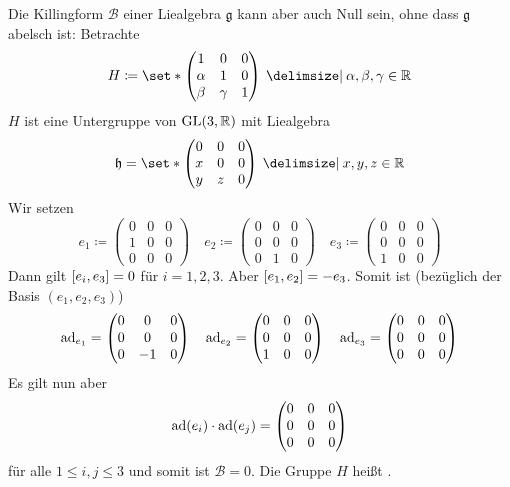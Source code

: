 \begin{beispiel*}[{name=[triviale Killingform trotz nicht abelscher Liealgebra]}]
	Die Killingform $\mathcal{B}$ einer Liealgebra $\mathfrak{g}$ kann aber auch Null sein, ohne dass $\mathfrak{g}$ abelsch ist: Betrachte
	\[
		H \coloneqq \set*{\begin{pmatrix}
			1 & 0 & 0 \\
			\alpha & 1 & 0 \\
			\beta & \gamma & 1
		\end{pmatrix} \given \alpha,\beta,\gamma \in \mathbb{R}}
	\]
	$H$ ist eine Untergruppe von $\GL(3,\mathbb{R})$ mit Liealgebra
	\[
		\mathfrak{h} = \set*{\begin{pmatrix}
			0 & 0 & 0 \\
			x & 0 & 0 \\
			y & z & 0
		\end{pmatrix} \given x,y,z \in \mathbb{R}}
	\]
	Wir setzen 
	\[
		e_1 \coloneqq \begin{pmatrix}
			0 & 0 & 0 \\
			1 & 0 & 0 \\
			0 & 0 & 0
		\end{pmatrix} \quad 
		e_2 \coloneqq \begin{pmatrix}
			0 & 0 & 0 \\
			0 & 0 & 0 \\
			0 & 1 & 0
		\end{pmatrix} \quad 
		e_3 \coloneqq \begin{pmatrix}
			0 & 0 & 0 \\
			0 & 0 & 0 \\
			1 & 0 & 0
		\end{pmatrix}
	\]
	Dann gilt $\benbrace*{e_i,e_3} = 0$ für $i=1,2,3$.
	Aber $\benbrace*{e_1,e_2}=-e_3$.
	Somit ist (bezüglich der Basis $(e_1,e_2,e_3)$)
	\[
		\ad_{e_1} = \begin{pmatrix}
			0 & 0 & 0 \\
			0 & 0 & 0 \\
			0 & -1 & 0
		\end{pmatrix} \quad 
		\ad_{e_2} = \begin{pmatrix}
			0 & 0 & 0 \\
			0 & 0 & 0 \\
			1 & 0 & 0 
		\end{pmatrix} \quad 
		\ad_{e_3} = \begin{pmatrix}
			0 & 0 & 0 \\
			0 & 0 & 0 \\
			0 & 0 & 0
		\end{pmatrix}
	\]
	Es gilt nun aber
	\[
		\ad(e_i) \cdot \ad(e_j) = \begin{pmatrix}
			0 & 0 & 0 \\
			0 & 0 & 0 \\
			0 & 0 & 0
		\end{pmatrix}
	\]
	für alle $1 \le i,j \le 3$ und somit ist $\mathcal{B}=0$.
	Die Gruppe $H$ heißt .
\end{beispiel*}


